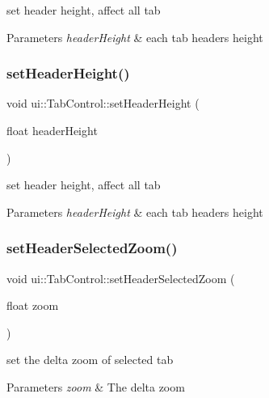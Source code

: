 set header height, affect all tab 
\begin{DoxyParams}{Parameters}
{\em header\+Height} & each tab header\textquotesingle{}s height \\
\hline
\end{DoxyParams}
\mbox{\label{classui_1_1TabControl_af24eae9f0c9d5613ccc4d28a37dc0f3a}} 
\subsubsection{\texorpdfstring{set\+Header\+Height()}{setHeaderHeight()}\hspace{0.1cm}{\footnotesize\ttfamily [2/2]}}
{\footnotesize\ttfamily void ui\+::\+Tab\+Control\+::set\+Header\+Height (\begin{DoxyParamCaption}\item[{float}]{header\+Height }\end{DoxyParamCaption})}

set header height, affect all tab 
\begin{DoxyParams}{Parameters}
{\em header\+Height} & each tab header\textquotesingle{}s height \\
\hline
\end{DoxyParams}
\mbox{\label{classui_1_1TabControl_ade6a8a4e54e5227c9e301fbb37967b96}} 
\subsubsection{\texorpdfstring{set\+Header\+Selected\+Zoom()}{setHeaderSelectedZoom()}\hspace{0.1cm}{\footnotesize\ttfamily [1/2]}}
{\footnotesize\ttfamily void ui\+::\+Tab\+Control\+::set\+Header\+Selected\+Zoom (\begin{DoxyParamCaption}\item[{float}]{zoom }\end{DoxyParamCaption})}

set the delta zoom of selected tab 
\begin{DoxyParams}{Parameters}
{\em zoom} & The delta zoom \\
\hline
\end{DoxyParams}
\mbox{\label{classui_1_1TabControl_ade6a8a4e54e5227c9e301fbb37967b96}} 
